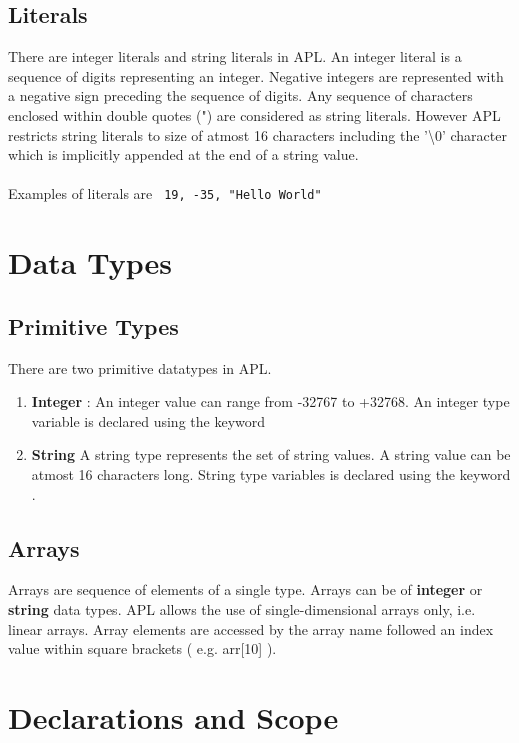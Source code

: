 \documentclass[11pt]{article}
\begin{document}
\subsection{Literals}
There are integer literals and string literals in APL. An integer literal is a sequence of digits representing an integer.
Negative integers are represented with a negative sign preceding the sequence of digits. Any sequence of characters enclosed within double quotes (") are considered as string literals. However APL restricts string literals to size of atmost 16 characters including the '\textbackslash 0' character which is implicitly appended at the end of a string value. 
\\
\\
Examples of literals are \texttt{
 19, -35, "Hello World"}


\section{Data Types}

\subsection{Primitive Types}
There are two primitive datatypes in APL. 
\begin{enumerate}

\item \textbf{Integer} : An integer value can range from -32767 to +32768. An integer type variable is declared using the keyword 
\item \textbf{String}  
A string type represents the set of string values. A string value can be atmost 16 characters long. String type variables is declared using the keyword .
\end{enumerate}


\subsection{Arrays}
Arrays are  sequence of elements of a single type. Arrays can be of \textbf{integer} or \textbf{string} data types.
APL allows the use of single-dimensional arrays only, i.e. linear arrays. Array elements are accessed by the array name followed an index value within square brackets ( e.g. arr[10] ).


\section{Declarations and Scope}
\end{document}
